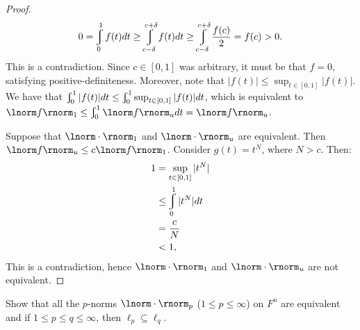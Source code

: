 \documentclass[11pt,twoside,openany]{memoir}
\renewcommand{\int}{\varint}
\begin{document}
\begin{proof}
                \begin{equation*}
                \begin{split}
                    0  =\int_0^1 f(t)dt \geq \int_{c - \delta}^{c+\delta}f(t)dt \geq \int_{c-\delta}^{c+\delta}\frac{f(c)}{2} = f(c) > 0.
                \end{split}
                \end{equation*}
            This is a contradiction. Since $c \in [0,1]$ was arbitrary, it must be that $f = 0$, satisfying positive-definiteness. Moreover, note that $|f(t)| \leq \sup_{t \in [0,1]}|f(t)|$. We have that $\int_0^1 |f(t)|dt \leq \int_0^1 \sup_{t \in [0,1]}|f(t)|dt$, which is equivalent to $\lnorm f \rnorm_1 \leq \int_0^1 \lnorm f \rnorm_u dt = \lnorm f \rnorm_u$.

            Suppose that $\lnorm \cdot \rnorm_1$ and $\lnorm \cdot \rnorm_u$ are equivalent. Then $\lnorm f \rnorm_u \leq c \lnorm f \rnorm_1$. Consider $g(t) = t^N$, where $N > c$. Then:
                \begin{equation*}
                \begin{split}
                    1 &= \sup_{t \in [0,1]}|t^N| \\
                    & \leq \int_0^1 |t^N| dt \\ 
                    & = \frac{c}{N} \\
                    & < 1,
                \end{split}
                \end{equation*}
            This is a contradiction, hence $\lnorm \cdot \rnorm_1$ and $\lnorm \cdot \rnorm_u$ are not equivalent.
        \end{proof}
    \begin{exercise}
        Show that all the $p$-norms $\lnorm \cdot \rnorm_p$ ($1 \leq p \leq \infty$) on $F^n$ are equivalent and if $1 \leq p \leq q \leq \infty$, then $\ell_p \subseteq \ell_q$.
    \end{exercise}
\end{document}
